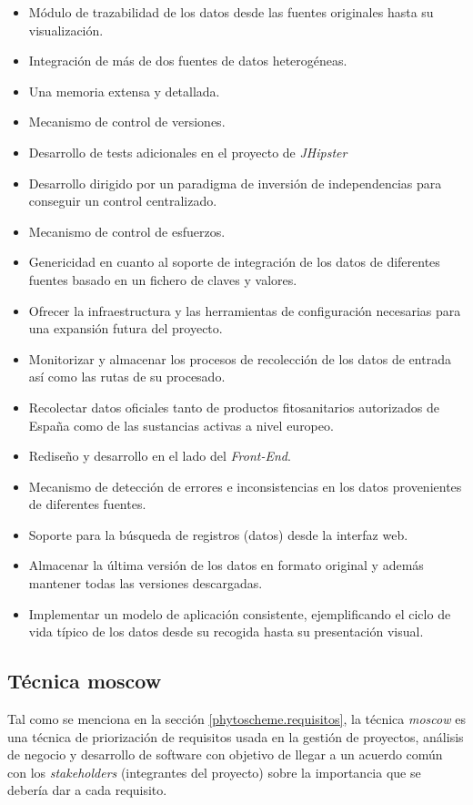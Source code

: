\begin{itemize}
\item Módulo de trazabilidad de los datos desde las fuentes originales hasta su visualización. 
\item Integración de más de dos fuentes de datos heterogéneas. 
\item Una memoria extensa y detallada.  
\item Mecanismo de control de versiones.
\item Desarrollo de tests adicionales en el proyecto de \textit{JHipster}
\item Desarrollo dirigido por un paradigma de inversión de independencias para conseguir un control centralizado.
\item Mecanismo de control de esfuerzos.
\item Genericidad en cuanto al soporte de integración de los datos de diferentes fuentes basado en un fichero de claves y valores. 
\item Ofrecer la infraestructura y las herramientas de configuración necesarias para una expansión futura del proyecto. 
\item Monitorizar y almacenar los procesos de recolección de los datos de entrada así como las rutas de su procesado.
\item Recolectar datos oficiales tanto de productos fitosanitarios autorizados de España como de las sustancias activas a nivel europeo. 
\item Rediseño y desarrollo en el lado del \textit{Front-End}.
\item Mecanismo de detección de errores e inconsistencias en los datos provenientes de diferentes fuentes.
\item Soporte para la búsqueda de registros (datos) desde la interfaz web. 
\item Almacenar la última versión de los datos en formato original y además mantener todas las versiones descargadas. 
\item Implementar un modelo de aplicación consistente, ejemplificando el ciclo de vida típico de los datos desde su recogida hasta su presentación visual. 
\end{itemize}

\subsection{Técnica \gls{moscow}} 
\label{c.analisis.requisitos.moscow}
Tal como se menciona en la sección \ref{phytoscheme.requisitos}, la técnica \textit{\gls{moscow}} es una técnica de priorización de requisitos usada en la gestión de proyectos, análisis de negocio y desarrollo de software con objetivo de llegar a un acuerdo común con los \textit{stakeholders} (integrantes del proyecto) sobre la importancia que se debería dar a cada requisito.
\par

